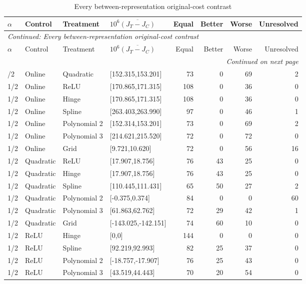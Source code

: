 \begingroup\footnotesize\setlength{\tabcolsep}{3pt}
\begin{longtable}{llllrrrr}
\caption{Every between-representation original-cost contrast}\label{tab:crossarm119b}\\
\toprule
$\alpha$ & Control & Treatment & $10^6\overline{(J_T-J_C)}$ & Equal & Better & Worse & Unresolved\\\midrule
\endfirsthead
\multicolumn{8}{l}{\textit{Continued: Every between-representation original-cost contrast}}\\
\toprule
$\alpha$ & Control & Treatment & $10^6\overline{(J_T-J_C)}$ & Equal & Better & Worse & Unresolved\\\midrule
\endhead
\midrule\multicolumn{8}{r}{\textit{Continued on next page}}\\
\endfoot
\bottomrule
\endlastfoot
1/2 & Online & Quadratic & [152.315,153.201] & 73 & 0 & 69 & 2 \\
1/2 & Online & ReLU & [170.865,171.315] & 108 & 0 & 36 & 0 \\
1/2 & Online & Hinge & [170.865,171.315] & 108 & 0 & 36 & 0 \\
1/2 & Online & Spline & [263.403,263.990] & 97 & 0 & 46 & 1 \\
1/2 & Online & Polynomial 2 & [152.314,153.201] & 73 & 0 & 69 & 2 \\
1/2 & Online & Polynomial 3 & [214.621,215.520] & 72 & 0 & 72 & 0 \\
1/2 & Online & Grid & [9.721,10.620] & 72 & 0 & 56 & 16 \\
1/2 & Quadratic & ReLU & [17.907,18.756] & 76 & 43 & 25 & 0 \\
1/2 & Quadratic & Hinge & [17.907,18.756] & 76 & 43 & 25 & 0 \\
1/2 & Quadratic & Spline & [110.445,111.431] & 65 & 50 & 27 & 2 \\
1/2 & Quadratic & Polynomial 2 & [-0.375,0.374] & 84 & 0 & 0 & 60 \\
1/2 & Quadratic & Polynomial 3 & [61.863,62.762] & 72 & 29 & 42 & 1 \\
1/2 & Quadratic & Grid & [-143.025,-142.151] & 74 & 60 & 10 & 0 \\
1/2 & ReLU & Hinge & [0,0] & 144 & 0 & 0 & 0 \\
1/2 & ReLU & Spline & [92.219,92.993] & 82 & 25 & 37 & 0 \\
1/2 & ReLU & Polynomial 2 & [-18.757,-17.907] & 76 & 25 & 43 & 0 \\
1/2 & ReLU & Polynomial 3 & [43.519,44.443] & 70 & 20 & 54 & 0 \\

\end{longtable}
